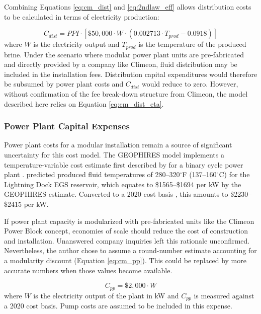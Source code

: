 Combining Equations \ref{eq:cm_dist} and \ref{eq:2ndlaw_eff} allows distribution costs to be calculated in terms of electricity production:

\begin{equation}
\label{eq:cm_dist_eta}
    C_{dist} = PPI \cdot \left[ \$50,000 \cdot W \cdot (0.002713 \cdot T_{prod} - 0.0918) \right]
\end{equation}
where $W$ is the electricity output and $T_{prod}$ is the temperature of the produced brine. Under the scenario where modular power plant units are pre-fabricated and directly provided by a company like Climeon, fluid distribution may be included in the installation fees. Distribution capital expenditures would therefore be subsumed by power plant costs and $C_{dist}$ would reduce to zero. However, without confirmation of the fee break-down structure from Climeon, the model described here relies on Equation \ref{eq:cm_dist_eta}. 

\subsubsection{Power Plant Capital Expenses}\label{ch4:cm_capex_pp}
Power plant costs for a modular installation remain a source of significant uncertainty for this cost model. The GEOPHIRES model implements a temperature-variable cost estimate first described by \citet{tester_future_2006} for a binary cycle power plant \citep{beckers_introducing_2013}. \citet{schochet_development_2001} predicted produced fluid temperatures of 280--320$^\circ$F (137--160$^\circ$C) for the Lightning Dock EGS reservoir, which equates to \$1565--\$1694 per kW by the GEOPHIRES estimate. Converted to a 2020 cost basis \citep{us_bls_ppi_2021}, this amounts to \$2230--\$2415 per kW.

If power plant capacity is modularized with pre-fabricated units like the Climeon Power Block concept, economies of scale should reduce the cost of construction and installation. Unanswered company inquiries left this rationale unconfirmed. Nevertheless, the author chose to assume a round-number estimate accounting for a modularity discount (Equation \ref{eq:cm_pp}). This could be replaced by more accurate numbers when those values become available.

\begin{equation}
\label{eq:cm_pp}
    C_{pp} = \$2,000 \cdot W
\end{equation}
where $W$ is the electricity output of the plant in kW and $C_{pp}$ is measured against a 2020 cost basis. Pump costs are assumed to be included in this expense.

